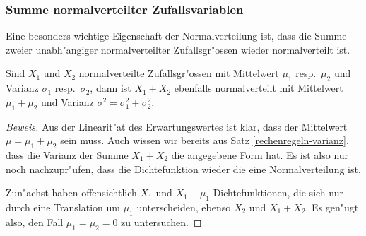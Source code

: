 \subsubsection{Summe normalverteilter Zufallsvariablen}

Eine besonders wichtige Eigenschaft der Normalverteilung ist, dass die
Summe zweier unabh"angiger normalverteilter Zufallsgr"ossen wieder normalverteilt
ist.
\begin{satz}
Sind $X_1$ und $X_2$ normalverteilte Zufallsgr"ossen mit Mittelwert $\mu_1$
resp.~$\mu_2$ und Varianz $\sigma_1$ resp.~$\sigma_2$, dann ist
$X_1+X_2$ ebenfalls normalverteilt mit Mittelwert $\mu_1+\mu_2$ und
Varianz $\sigma^2=\sigma_1^2+\sigma_2^2$.
\end{satz}
\begin{proof}[Beweis]
Aus der Linearit"at des Erwartungswertes ist klar, dass der Mittelwert
$\mu=\mu_1+\mu_2$ sein muss.
Auch wissen wir bereits aus Satz \ref{rechenregeln-varianz}, dass
die Varianz der Summe $X_1+X_2$ die angegebene Form hat. Es ist also nur
noch nachzupr"ufen, dass die Dichtefunktion wieder die eine Normalverteilung
ist.

Zun"achst haben offensichtlich $X_1$ und $X_1-\mu_1$ Dichtefunktionen,
die sich nur durch eine Translation um $\mu_1$  unterscheiden, ebenso
$X_2$ und $X_1+X_2$. Es gen"ugt also, den Fall $\mu_1=\mu_2=0$
zu untersuchen.


\end{proof}
